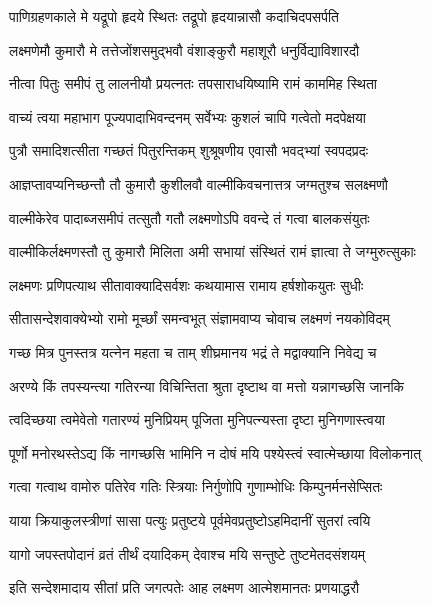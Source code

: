 \twolineshloka
{पाणिग्रहणकाले मे यद्रूपो हृदये स्थितः}
{तद्रूपो हृदयान्नासौ कदाचिदपसर्पति}%

\twolineshloka
{लक्ष्मणेमौ कुमारौ मे तत्तेजोंशसमुद्भवौ}
{वंशाङ्कुरौ महाशूरौ धनुर्विद्याविशारदौ}%

\twolineshloka
{नीत्वा पितुः समीपं तु लालनीयौ प्रयत्नतः}
{तपसाराधयिष्यामि रामं काममिह स्थिता}%

\twolineshloka
{वाच्यं त्वया महाभाग पूज्यपादाभिवन्दनम्}
{सर्वेभ्यः कुशलं चापि गत्वेतो मदपेक्षया}%

\twolineshloka
{पुत्रौ समादिशत्सीता गच्छतं पितुरन्तिकम्}
{शुश्रूषणीय एवासौ भवद्भ्यां स्वपदप्रदः}%

\twolineshloka
{आज्ञप्तावप्यनिच्छन्तौ तौ कुमारौ कुशीलवौ}
{वाल्मीकिवचनात्तत्र जग्मतुश्च सलक्ष्मणौ}%

\twolineshloka
{वाल्मीकेरेव पादाब्जसमीपं तत्सुतौ गतौ}
{लक्ष्मणोऽपि ववन्दे तं गत्वा बालकसंयुतः}%

\twolineshloka
{वाल्मीकिर्लक्ष्मणस्तौ तु कुमारौ मिलिता अमी}
{सभायां संस्थितं रामं ज्ञात्वा ते जग्मुरुत्सुकाः}%

\twolineshloka
{लक्ष्मणः प्रणिपत्याथ सीतावाक्यादिसर्वशः}
{कथयामास रामाय हर्षशोकयुतः सुधीः}%

\twolineshloka
{सीतासन्देशवाक्येभ्यो रामो मूर्च्छां समन्वभूत्}
{संज्ञामवाप्य चोवाच लक्ष्मणं नयकोविदम्}%

\twolineshloka
{गच्छ मित्र पुनस्तत्र यत्नेन महता च ताम्}
{शीघ्रमानय भद्रं ते मद्वाक्यानि निवेद्य च}%

\twolineshloka
{अरण्ये किं तपस्यन्त्या गतिरन्या विचिन्तिता}
{श्रुता दृष्टाथ वा मत्तो यन्नागच्छसि जानकि}%

\twolineshloka
{त्वदिच्छया त्वमेवेतो गतारण्यं मुनिप्रियम्}
{पूजिता मुनिपत्न्यस्ता दृष्टा मुनिगणास्त्वया}%

\twolineshloka
{पूर्णो मनोरथस्तेऽद्य किं नागच्छसि भामिनि}
{न दोषं मयि पश्येस्त्वं स्वात्मेच्छाया विलोकनात्}%

\twolineshloka
{गत्वा गत्वाथ वामोरु पतिरेव गतिः स्त्रियाः}
{निर्गुणोपि गुणाम्भोधिः किम्पुनर्मनसेप्सितः}%

\twolineshloka
{याया क्रियाकुलस्त्रीणां सासा पत्युः प्रतुष्टये}
{पूर्वमेवप्रतुष्टोऽहमिदानीं सुतरां त्वयि}%

\twolineshloka
{यागो जपस्तपोदानं व्रतं तीर्थं दयादिकम्}
{देवाश्च मयि सन्तुष्टे तुष्टमेतदसंशयम्}%


\twolineshloka
{इति सन्देशमादाय सीतां प्रति जगत्पतेः}
{आह लक्ष्मण आत्मेशमानतः प्रणयाद्धरौ}%

